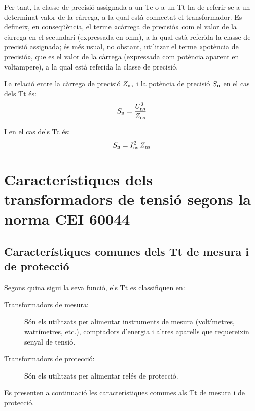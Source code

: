 Per tant, la classe de precisió assignada a un Tc o a un Tt ha de
referir-se a un determinat valor de la càrrega, a la qual està
connectat el transformador. Es defineix, en conseqüència, el terme
«càrrega de precisió» com el valor de la càrrega en el secundari
(expressada en ohm), a la qual està referida la classe de precisió
assignada; és més usual, no obstant,  utilitzar el terme «potència
de precisió», que es el valor de la càrrega (expressada com potència
aparent en voltampere),
 a la qual està referida la classe de precisió.

La relació entre la càrrega de precisió $Z_\mathrm{ns}$ i la potència de
precisió $S_\mathrm{n}$ en el cas dels Tt és:
\begin{equation}
    S_\mathrm{n} = \frac{U_\mathrm{ns}^2}{Z_\mathrm{ns}}
\end{equation}

I en el cas dels Tc és:
\begin{equation}\label{eq:sn_ti}
    S_\mathrm{n} = I_\mathrm{ns}^2 \,Z_\mathrm{ns}
\end{equation}


\section{Característiques dels transformadors de tensió segons la norma CEI 60044}

\subsection{Característiques comunes dels Tt de mesura i de protecció}

Segons quina sigui la seva funció, els Tt es classifiquen en:
\begin{description}
   \item [\hspace{5mm}Transformadors de mesura:] Són els utilitzats per alimentar
            instruments de mesura (voltímetres, wattímetres, etc.),
            comptadors d'energia i altres aparells que requereixin senyal de tensió.
   \item [\hspace{5mm}Transformadors de protecció:] Són els utilitzats per
   alimentar relés de protecció.
\end{description}

Es presenten a continuació les característiques comunes als Tt de
mesura i de protecció.

